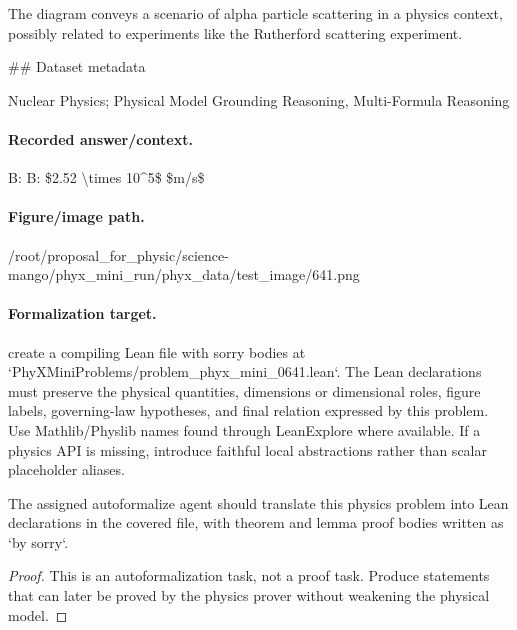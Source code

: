 The diagram conveys a scenario of alpha particle scattering in a physics context, possibly related to experiments like the Rutherford scattering experiment.

\#\# Dataset metadata

Nuclear Physics; Physical Model Grounding Reasoning, Multi-Formula Reasoning

\paragraph{Recorded answer/context.}
B: B: \$2.52 \textbackslash{}times 10\textasciicircum{}5\$ \$m/s\$

\paragraph{Figure/image path.}
/root/proposal\_for\_physic/science-mango/phyx\_mini\_run/phyx\_data/test\_image/641.png

\paragraph{Formalization target.}
create a compiling Lean file with sorry bodies at `PhyXMiniProblems/problem\_phyx\_mini\_0641.lean`. The Lean declarations must preserve the physical quantities, dimensions or dimensional roles, figure labels, governing-law hypotheses, and final relation expressed by this problem.
Use Mathlib/Physlib names found through LeanExplore where available. If a physics API is missing, introduce faithful local abstractions rather than scalar placeholder aliases.

\begin{theorem}
\label{thm:physics:phyx_mini_0641:target}
The assigned autoformalize agent should translate this physics problem into Lean declarations in the covered file, with theorem and lemma proof bodies written as `by sorry`.
\end{theorem}
\begin{proof}
This is an autoformalization task, not a proof task. Produce statements that can later be proved by the physics prover without weakening the physical model.
\end{proof}

